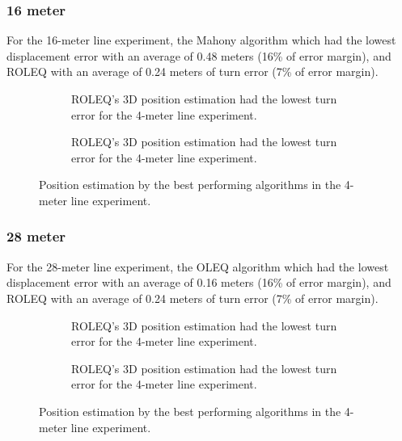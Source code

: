 \subsubsection{16 meter}
For the 16-meter line experiment, the Mahony algorithm which had the lowest displacement error with an average of 0.48 meters (16\% of error margin), and ROLEQ with an average of 0.24 meters of turn error (7\% of error margin).

\begin{figure}[!h]
    \centering
    
\end{figure}

\begin{figure}[!h]
    \centering
    \begin{subfigure}{0.49\textwidth}
        \centering
        \resizebox{1\linewidth}{!}{}
        \caption{ ROLEQ's 3D position estimation had the lowest turn error for the 4-meter line experiment. }
        \label{fig:line16_2D}
    \end{subfigure}
    \begin{subfigure}{0.49\textwidth}
        \centering
        \resizebox{1\linewidth}{!}{}
        \caption{ROLEQ's 3D position estimation had the lowest turn error for the 4-meter line experiment.}
        \label{fig:line16_3D}
    \end{subfigure}
    \caption{Position estimation by the best performing algorithms in the 4-meter line experiment.}
    \label{fig:line16}
\end{figure}

\subsubsection{28 meter}

For the 28-meter line experiment, the OLEQ algorithm which had the lowest displacement error with an average of 0.16 meters (16\% of error margin), and ROLEQ with an average of 0.24 meters of turn error (7\% of error margin).

\begin{figure}[!h]
    \centering
    
\end{figure}

\begin{figure}[!h]
    \centering
    \begin{subfigure}{0.49\textwidth}
        \centering
        \resizebox{1\linewidth}{!}{}
        \caption{ROLEQ's 3D position estimation had the lowest turn error for the 4-meter line experiment.}
        \label{fig:line28_2D}
    \end{subfigure}
    \begin{subfigure}{0.49\textwidth}
        \centering
        \resizebox{1\linewidth}{!}{}
        \caption{ROLEQ's 3D position estimation had the lowest turn error for the 4-meter line experiment.}
        \label{fig:line28_3D}
    \end{subfigure}
    \caption{Position estimation by the best performing algorithms in the 4-meter line experiment.}
    \label{fig:line28}
\end{figure}

